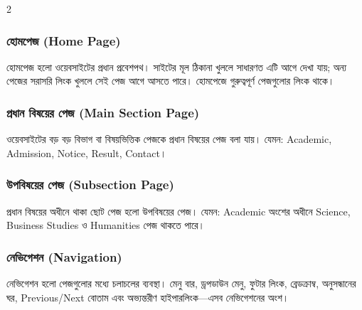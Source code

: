 \begin{multicols}{2}
\noindent\begin{minipage}[t]{\linewidth}\vspace{0pt}
\subsubsection{হোমপেজ (Home Page)}

হোমপেজ হলো ওয়েবসাইটের প্রধান প্রবেশপথ। সাইটের মূল ঠিকানা খুললে সাধারণত এটি আগে দেখা যায়; অন্য পেজের সরাসরি লিংক খুললে সেই পেজ আগে আসতে পারে। হোমপেজে গুরুত্বপূর্ণ পেজগুলোর লিংক থাকে।
\end{minipage}\par\smallskip
\noindent\begin{minipage}[t]{\linewidth}\vspace{0pt}
\subsubsection{প্রধান বিষয়ের পেজ (Main Section Page)}

ওয়েবসাইটের বড় বড় বিভাগ বা বিষয়ভিত্তিক পেজকে প্রধান বিষয়ের পেজ বলা যায়। যেমন: Academic, Admission, Notice, Result, Contact।
\end{minipage}\par\smallskip
\noindent\begin{minipage}[t]{\linewidth}\vspace{0pt}
\subsubsection{উপবিষয়ের পেজ (Subsection Page)}

প্রধান বিষয়ের অধীনে থাকা ছোট পেজ হলো উপবিষয়ের পেজ। যেমন: Academic অংশের অধীনে Science, Business Studies ও Humanities পেজ থাকতে পারে।
\end{minipage}\par\smallskip
\noindent\begin{minipage}[t]{\linewidth}\vspace{0pt}
\subsubsection{নেভিগেশন (Navigation)}

নেভিগেশন হলো পেজগুলোর মধ্যে চলাচলের ব্যবস্থা। মেনু বার, ড্রপডাউন মেনু, ফুটার লিংক, ব্রেডক্রাম্ব, অনুসন্ধানের ঘর, Previous/Next বোতাম এবং অভ্যন্তরীণ হাইপারলিংক—এসব নেভিগেশনের অংশ।
\end{minipage}\par\smallskip
\end{multicols}


